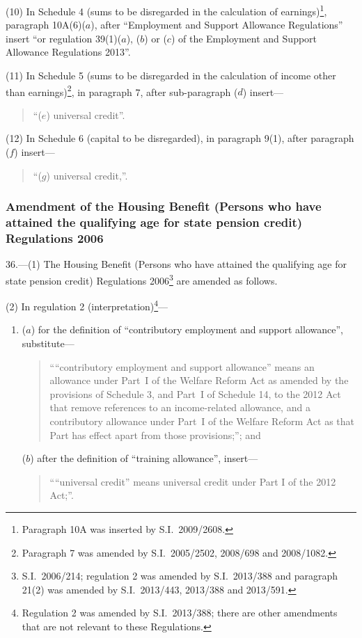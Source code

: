 \documentclass[12pt,a4paper]{article}
\begin{document}
(10) In Schedule 4 (sums to be disregarded in the calculation of earnings)\footnote{Paragraph 10A was inserted by S.I.~2009/2608.}, paragraph 10A(6)($a$), after “Employment and Support Allowance Regulations” insert “or regulation 39(1)($a$), ($b$)  or ($c$)  of the Employment and Support Allowance Regulations 2013”.

(11) In Schedule 5 (sums to be disregarded in the calculation of income other than earnings)\footnote{Paragraph 7 was amended by S.I.~2005/2502, 2008/698 and 2008/1082.}, in paragraph 7, after sub-paragraph ($d$)  insert—
\begin{quotation}
“($e$) universal credit”.
\end{quotation}

(12) In Schedule 6 (capital to be disregarded), in paragraph 9(1), after paragraph ($f$)  insert—
\begin{quotation}
“($g$) universal credit,”.
\end{quotation}

\subsubsection[36. Amendment of the Housing Benefit (Persons who have attained the qualifying age for state pension credit) Regulations 2006]{Amendment of the Housing Benefit (Persons who have attained the qualifying age for state pension credit) Regulations 2006}

36.—(1) The Housing Benefit (Persons who have attained the qualifying age for state pension credit) Regulations 2006\footnote{S.I.~2006/214; regulation 2 was amended by S.I.~2013/388 and paragraph 21(2) was amended by S.I.~2013/443, 2013/388 and 2013/591.} are amended as follows.

(2) In regulation 2 (interpretation)\footnote{Regulation 2 was amended by S.I.~2013/388; there are other amendments that are not relevant to these Regulations.}—
\begin{enumerate}\item[]
($a$) for the definition of “contributory employment and support allowance”, substitute—
\begin{quotation}
““contributory employment and support allowance” means an allowance under Part~I of the Welfare Reform Act as amended by the provisions of Schedule 3, and Part~I of Schedule 14, to the 2012 Act that remove references to an income-related allowance, and a contributory allowance under Part~I of the Welfare Reform Act as that Part has effect apart from those provisions;”; and
\end{quotation}

($b$) after the definition of “training allowance”, insert—
\begin{quotation}
““universal credit” means universal credit under Part I of the 2012 Act;”.
\end{quotation}
\end{enumerate}
\end{document}
